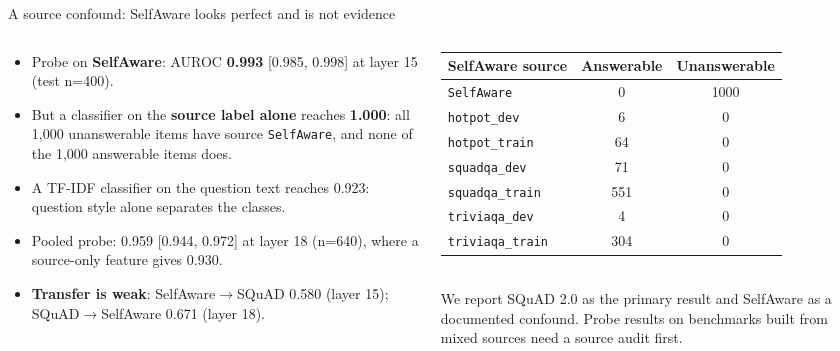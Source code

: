 \documentclass[aspectratio=169,11pt,usepdftitle=false]{beamer}
\newcommand{\code}[1]{\texttt{#1}}
\begin{document}
\begin{frame}{A source confound: SelfAware looks perfect and is not evidence}
\footnotesize
\begin{columns}[T]
\begin{column}{0.50\textwidth}
\begin{itemize}
\item Probe on \textbf{SelfAware}: AUROC \textbf{0.993} [0.985, 0.998] at layer 15 (test n=400).
\item But a classifier on the \textbf{source label alone} reaches \textbf{1.000}: all 1,000 unanswerable items have source \code{SelfAware}, and none of the 1,000 answerable items does.
\item A TF-IDF classifier on the question text reaches 0.923: question style alone separates the classes.
\item Pooled probe: 0.959 [0.944, 0.972] at layer 18 (n=640), where a source-only feature gives 0.930.
\item \textbf{Transfer is weak}: SelfAware$\to$SQuAD 0.580 (layer 15); SQuAD$\to$SelfAware 0.671 (layer 18).
\end{itemize}
\end{column}
\begin{column}{0.46\textwidth}
\scriptsize
\setlength{\tabcolsep}{4pt}
\begin{tabular}{@{}lcc@{}}
\toprule
SelfAware source & Answerable & Unanswerable \\
\midrule
\code{SelfAware} & 0 & 1000 \\
\code{hotpot\_dev} & 6 & 0 \\
\code{hotpot\_train} & 64 & 0 \\
\code{squadqa\_dev} & 71 & 0 \\
\code{squadqa\_train} & 551 & 0 \\
\code{triviaqa\_dev} & 4 & 0 \\
\code{triviaqa\_train} & 304 & 0 \\
\bottomrule
\end{tabular}\\[6pt]
\footnotesize
We report SQuAD 2.0 as the primary result and SelfAware as a documented confound. Probe results on benchmarks built from mixed sources need a source audit first.
\end{column}
\end{columns}
\end{frame}
\end{document}
